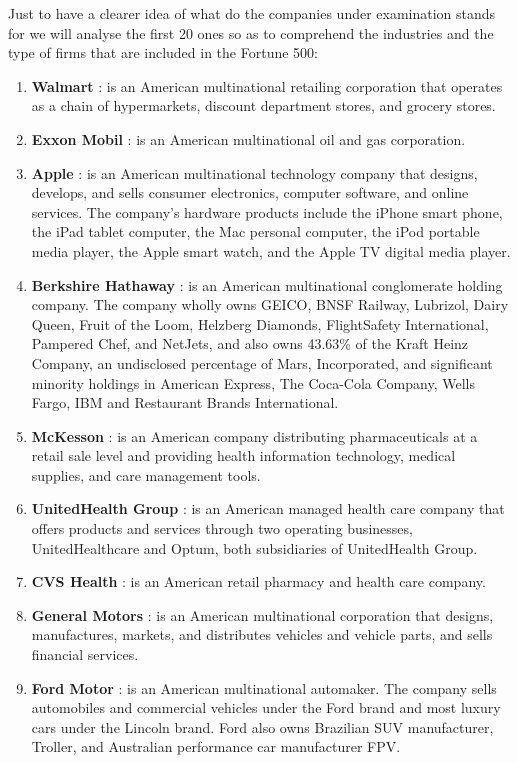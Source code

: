 \documentclass{article}
\begin{document}
Just to have a clearer idea of what do the companies under examination stands for we will analyse the first 20 ones so as to comprehend the industries and the type of firms that are included in the Fortune 500:
\begin{enumerate}
\item \textbf{Walmart }: is an American multinational retailing corporation that operates as a chain of hypermarkets, discount department stores, and grocery stores.
\item \textbf{Exxon Mobil } : is an American multinational oil and gas corporation.
\item \textbf{Apple } : is an American multinational technology company that designs, develops, and sells consumer electronics, computer software, and online services. The company's hardware products include the iPhone smart phone, the iPad tablet computer, the Mac personal computer, the iPod portable media player, the Apple smart watch, and the Apple TV digital media player. 
\item \textbf{Berkshire Hathaway } : is an American multinational conglomerate holding company. The company wholly owns GEICO, BNSF Railway, Lubrizol, Dairy Queen, Fruit of the Loom, Helzberg Diamonds, FlightSafety International, Pampered Chef, and NetJets, and also owns 43.63\% of the Kraft Heinz Company, an undisclosed percentage of Mars, Incorporated, and significant minority holdings in American Express, The Coca-Cola Company, Wells Fargo, IBM and Restaurant Brands International. 
\item \textbf{McKesson } : is an American company distributing pharmaceuticals at a retail sale level and providing health information technology, medical supplies, and care management tools.
\item \textbf{UnitedHealth Group } :  is an American managed health care company that offers products and services through two operating businesses, UnitedHealthcare and Optum, both subsidiaries of UnitedHealth Group. 
\item \textbf{CVS Health }:  is an American retail pharmacy and health care company. 
\item \textbf{General Motors }: is an American multinational corporation that designs, manufactures, markets, and distributes vehicles and vehicle parts, and sells financial services. 
\item \textbf{Ford Motor } :  is an American multinational automaker. The company sells automobiles and commercial vehicles under the Ford brand and most luxury cars under the Lincoln brand. Ford also owns Brazilian SUV manufacturer, Troller, and Australian performance car manufacturer FPV. 

\end{enumerate}
\end{document}
